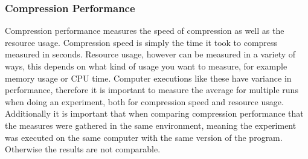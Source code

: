 \subsubsection{Compression Performance}
Compression performance measures the speed of compression as well as the resource usage. Compression speed is simply the time it took to compress measured in seconds. Resource usage, however can be measured in a variety of ways, this depends on what kind of usage you want to measure, for example memory usage or CPU time. Computer executions like these have variance in performance, therefore it is important to measure the average for multiple runs when doing an experiment, both for compression speed and resource usage. Additionally it is important that when comparing compression performance that the measures were gathered in the same environment, meaning the experiment was executed on the same computer with the same version of the program. Otherwise the results are not comparable.